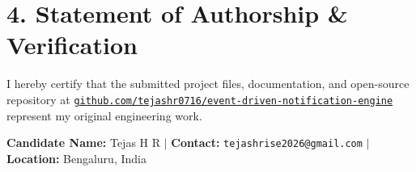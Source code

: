 \documentclass[11pt,a4paper]{article}
\begin{document}
\section{4. Statement of Authorship \& Verification}
I hereby certify that the submitted project files, documentation, and open-source repository at \href{https://github.com/tejashr0716/event-driven-notification-engine}{\texttt{github.com/tejashr0716/event-driven-notification-engine}} represent my original engineering work.

\vspace{10pt}
\textbf{Candidate Name:} Tejas H R \quad $|$ \quad \textbf{Contact:} \texttt{tejashrise2026@gmail.com} \quad $|$ \quad \textbf{Location:} Bengaluru, India
\end{document}
